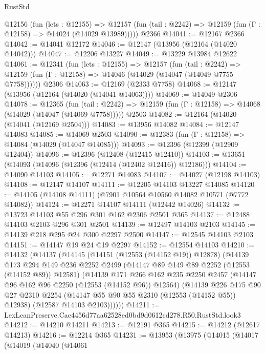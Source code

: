 \begin{lexlean}{RustStd}
\begin{coremodule}
    @12156
      (fun (lets : @12155) =>
      @12157 (fun (tail : @2242) => @12159 (fun (Γ : @12158) => @14024 (@14029 @13989)))))
    @2366
@14041 := @12167 @2366
@14042 := @14041 @12172
@14046 := @12147 (@13956 (@12164 (@14020 @14042)))
@14047 := @12206 @13227
@14049 := @13229 @13984 @12622
@14061 := @12341
    (fun (lets : @12155) =>
    @12157
      (fun (tail : @2242) =>
      @12159 (fun (Γ : @12158) => @14046 (@14029 (@14047 (@14049 @7755 @7758))))))
    @2306
@14063 := @12169 (@2333 @7758)
@14068 := @12147 (@13956 (@12164 (@14020 (@14041 @14063))))
@14069 := @14049 @2306
@14078 := @12365
    (fun (tail : @2242) => @12159 (fun (Γ : @12158) => @14068 (@14029 (@14047 (@14069 @7758)))))
    @2503
@14082 := @12164 (@14020 (@14041 (@12169 @2504)))
@14083 := @13956 @14082
@14084 := @12147 @14083
@14085 := @14069 @2503
@14090 := @12383 (fun (Γ : @12158) => @14084 (@14029 (@14047 @14085)))
@14093 := @12396 (@12399 (@12909 @12404))
@14096 := @12396 (@12408 (@12415 @12410))
@14103 := @13651 (@14093 (@14096 (@12396 (@12414 (@12402 @12416)) @12186)))
@14104 := @14090 @14103
@14105 := @12271 @14083
@14107 := @14027 (@12198 @14103)
@14108 := @12147 @14107
@14111 := @12205 @14103 @13227 @14085
@14120 := @14105 (@14108 @14111) (@7901 @10564 @10560 @14082 @10571 (@7772 @14082))
@14124 := @12271 @14107 @14111 (@12442 @14026)
@14132 := @13723 @14103 @55 @296 @301 @162 @2306 @2501 @365
@14137 := @12488 @14103 @2103 @296 @301 @2501
@14139 := @12497 @14103 @2103
@14145 := @14139 @218 @295 @24 @300 @2297 @2500
@14147 := @12545 @14103 @2103
@14151 := @14147 @19 @24 @19 @2297
@14152 := @12554 @14103
@14210 := @14132
    (@14137
      (@14145
        (@14151 (@12553 (@14152 @19)) @12878)
        (@14139
          @173
          @294
          @149
          @236
          @2252
          @2499
          (@14147 @89 @149 @89 @2252 (@12553 (@14152 @89)) @12581)
          (@14139
            @171
            @266
            @162
            @235
            @2250
            @2457
            (@14147 @96 @162 @96 @2250 (@12553 (@14152 @96)) @12564)
            (@14139
              @226
              @175
              @90
              @27
              @2310
              @2254
              (@14147 @55 @90 @55 @2310 (@12553 (@14152 @55)) @12938)
              (@12587 @14103 @2103))))))
@14211 := LexLeanPreserve.Cae4456d77aa62528ed0bd9d0612cd278.R50.RustStd.look3
@14212 := @14210 @14211
@14213 := @12191 @365
@14215 := @14212 (@12617 @14213)
@14216 := @12214 @365
@14231 := @13953
    (@13975
      (@14015
        (@14017
          (@14019
            (@14040
              (@14061

\end{coremodule}
\end{lexlean}
